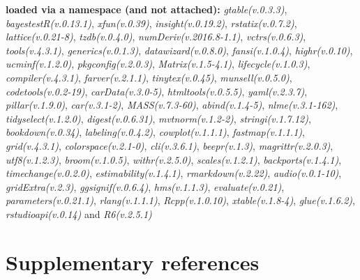 \documentclass[
  bookmarksnumbered]{article}
\begin{document}
\textbf{loaded via a namespace (and not attached):}
\emph{gtable(v.0.3.3)}, \emph{bayestestR(v.0.13.1)}, \emph{xfun(v.0.39)}, \emph{insight(v.0.19.2)}, \emph{rstatix(v.0.7.2)}, \emph{lattice(v.0.21-8)}, \emph{tzdb(v.0.4.0)}, \emph{numDeriv(v.2016.8-1.1)}, \emph{vctrs(v.0.6.3)}, \emph{tools(v.4.3.1)}, \emph{generics(v.0.1.3)}, \emph{datawizard(v.0.8.0)}, \emph{fansi(v.1.0.4)}, \emph{highr(v.0.10)}, \emph{ucminf(v.1.2.0)}, \emph{pkgconfig(v.2.0.3)}, \emph{Matrix(v.1.5-4.1)}, \emph{lifecycle(v.1.0.3)}, \emph{compiler(v.4.3.1)}, \emph{farver(v.2.1.1)}, \emph{tinytex(v.0.45)}, \emph{munsell(v.0.5.0)}, \emph{codetools(v.0.2-19)}, \emph{carData(v.3.0-5)}, \emph{htmltools(v.0.5.5)}, \emph{yaml(v.2.3.7)}, \emph{pillar(v.1.9.0)}, \emph{car(v.3.1-2)}, \emph{MASS(v.7.3-60)}, \emph{abind(v.1.4-5)}, \emph{nlme(v.3.1-162)}, \emph{tidyselect(v.1.2.0)}, \emph{digest(v.0.6.31)}, \emph{mvtnorm(v.1.2-2)}, \emph{stringi(v.1.7.12)}, \emph{bookdown(v.0.34)}, \emph{labeling(v.0.4.2)}, \emph{cowplot(v.1.1.1)}, \emph{fastmap(v.1.1.1)}, \emph{grid(v.4.3.1)}, \emph{colorspace(v.2.1-0)}, \emph{cli(v.3.6.1)}, \emph{beepr(v.1.3)}, \emph{magrittr(v.2.0.3)}, \emph{utf8(v.1.2.3)}, \emph{broom(v.1.0.5)}, \emph{withr(v.2.5.0)}, \emph{scales(v.1.2.1)}, \emph{backports(v.1.4.1)}, \emph{timechange(v.0.2.0)}, \emph{estimability(v.1.4.1)}, \emph{rmarkdown(v.2.22)}, \emph{audio(v.0.1-10)}, \emph{gridExtra(v.2.3)}, \emph{ggsignif(v.0.6.4)}, \emph{hms(v.1.1.3)}, \emph{evaluate(v.0.21)}, \emph{parameters(v.0.21.1)}, \emph{rlang(v.1.1.1)}, \emph{Rcpp(v.1.0.10)}, \emph{xtable(v.1.8-4)}, \emph{glue(v.1.6.2)}, \emph{rstudioapi(v.0.14)} and \emph{R6(v.2.5.1)}

\hypertarget{refs}{%
\section*{Supplementary references}\label{refs}}
\end{document}
